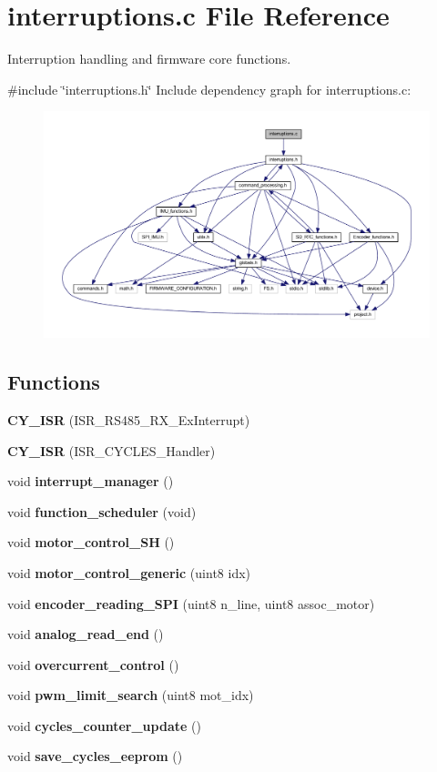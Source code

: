 \section{interruptions.\+c File Reference}
\label{interruptions_8c}


Interruption handling and firmware core functions.  


{\ttfamily \#include \char`\"{}interruptions.\+h\char`\"{}}\newline
Include dependency graph for interruptions.\+c\+:\nopagebreak
\begin{figure}[H]
\begin{center}
\leavevmode
\includegraphics[width=350pt]{interruptions_8c__incl}
\end{center}
\end{figure}
\subsection*{Functions}
\begin{DoxyCompactItemize}
\item 
\mbox{\label{interruptions_8c_a7692d8c3185943c5bdfaa6de0a172ad3}} 
{\bfseries C\+Y\+\_\+\+I\+SR} (I\+S\+R\+\_\+\+R\+S485\+\_\+\+R\+X\+\_\+\+Ex\+Interrupt)
\item 
\mbox{\label{interruptions_8c_a2347671848e5c23aa5df4ce2f2fd869d}} 
{\bfseries C\+Y\+\_\+\+I\+SR} (I\+S\+R\+\_\+\+C\+Y\+C\+L\+E\+S\+\_\+\+Handler)
\item 
void \textbf{ interrupt\+\_\+manager} ()
\item 
void \textbf{ function\+\_\+scheduler} (void)
\item 
void \textbf{ motor\+\_\+control\+\_\+\+SH} ()
\item 
void \textbf{ motor\+\_\+control\+\_\+generic} (uint8 idx)
\item 
void \textbf{ encoder\+\_\+reading\+\_\+\+S\+PI} (uint8 n\+\_\+line, uint8 assoc\+\_\+motor)
\item 
void \textbf{ analog\+\_\+read\+\_\+end} ()
\item 
void \textbf{ overcurrent\+\_\+control} ()
\item 
void \textbf{ pwm\+\_\+limit\+\_\+search} (uint8 mot\+\_\+idx)
\item 
void \textbf{ cycles\+\_\+counter\+\_\+update} ()
\item 
void \textbf{ save\+\_\+cycles\+\_\+eeprom} ()
\end{DoxyCompactItemize}
